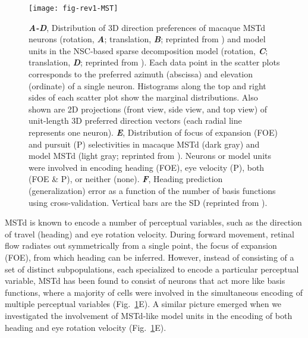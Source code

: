 \begin{figure}[ht]
	\centering
	\texttt{[image: fig-rev1-MST]}
    \caption{
    \textbf{\emph{A-D}},
         Distribution of 3D direction preferences of macaque \ac{MSTd} neurons
         (rotation, \textbf{\emph{A}}; translation, \textbf{\emph{B}}; 
         reprinted  from \cite{Takahashi2007})
         and model units in the \ac{NSC}-based sparse decomposition model
         (rotation, \textbf{\emph{C}}; translation, \textbf{\emph{D}}; 
         reprinted  from \cite{Beyeler2016}).
         Each data point in the scatter plots corresponds to the preferred azimuth
         (abscissa) and elevation (ordinate) of a single neuron.
         Histograms along the top and right sides of each scatter plot show the
         marginal distributions.
         Also shown are 2D projections (front view, side view, and top view)
         of unit-length 3D preferred direction vectors (each radial line represents
         one neuron).
    \textbf{\emph{E}},
         Distribution of focus of expansion (FOE) and pursuit (P) selectivities
         in macaque \ac{MSTd} (dark gray) and model \ac{MSTd} (light gray;
         reprinted  from \cite{Beyeler2016}).
         Neurons or model units were involved in encoding heading (FOE),
         eye velocity (P), both (FOE \& P), or neither (none).
    \textbf{\emph{F}},
         Heading prediction (generalization) error as a function of the
         number of basis functions using cross-validation.
         Vertical bars are the SD (reprinted 
         from \cite{Beyeler2016}).
    }
	\label{fig:NMF|MSTd}
\end{figure}

\ac{MSTd} is known to encode a number of perceptual variables,
such as the direction of travel (heading) and eye rotation velocity.
During forward movement, retinal flow radiates out symmetrically from a single point,
the focus of expansion (FOE), from which heading can be inferred.
However, instead of consisting of a set of distinct subpopulations,
each specialized to encode a particular perceptual variable,
\ac{MSTd} has been found to consist of neurons that act more like basis functions,
where a majority of cells were involved in the simultaneous encoding of multiple
perceptual variables (Fig.~\ref{fig:NMF|MSTd}E).
A similar picture emerged when we investigated the involvement of \ac{MSTd}-like
model units in the encoding of both heading and eye rotation velocity
(Fig.~\ref{fig:NMF|MSTd}E).

